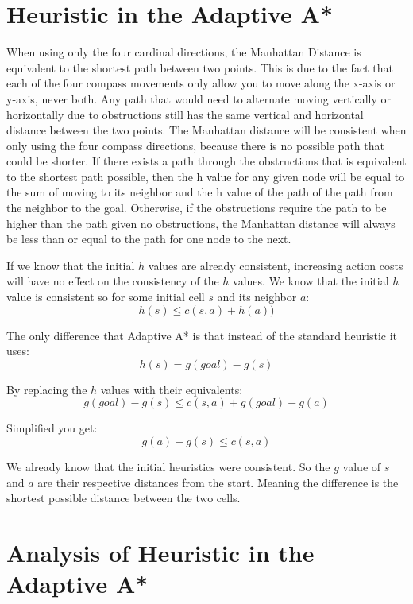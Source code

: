 \documentclass{article}
\begin{document}
\section{Heuristic in the Adaptive A*}
    When using only the four cardinal directions, the Manhattan Distance is equivalent to the shortest path between two points. This is due to the fact that each of the four compass movements only allow you to move along the x-axis or y-axis, never both. Any path that would need to alternate moving vertically or horizontally due to obstructions still has the same vertical and horizontal distance between the two points. The Manhattan distance will be consistent when only using the four compass directions, because there is no possible path that could be shorter. If there exists a path through the obstructions that is equivalent to the shortest path possible, then the h value for any given node will be equal to the sum of moving to its neighbor and the h value of the path of the path from the neighbor to the goal. Otherwise, if the obstructions require the path to be higher than the path given no obstructions, the Manhattan distance will always be less than or equal to the path for one node to the next. \par
    If we know that the initial $h$ values are already consistent, increasing action costs will have no effect on the consistency of the $h$ values. We know that the initial $h$ value is consistent so for some initial cell $s$ and its neighbor $a$:
    \[h(s) \leq c(s,a) + h(a))\] \par
    The only difference that Adaptive A* is that instead of the standard heuristic it uses:
    \[h(s) = g(goal) - g(s)\] \par
    By replacing the $h$ values with their equivalents:
    \[g(goal) - g(s) \leq c(s,a) + g(goal) - g(a) \] \par
    Simplified you get:
    \[ g(a) - g(s) \leq c(s,a)\] \par
    We already know that the initial heuristics were consistent. So the $g$ value of $s$ and $a$ are their respective distances from the start. Meaning the difference is the shortest possible distance between the two cells. 
\section{Analysis of Heuristic in the Adaptive A*}
\end{document}
